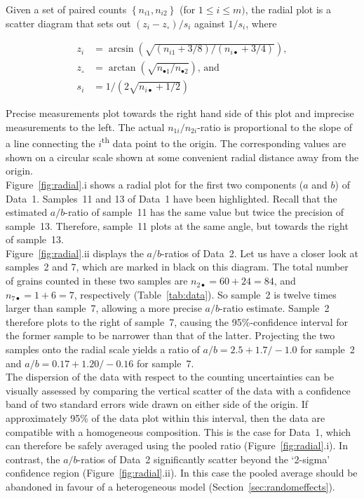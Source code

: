 \documentclass{article}
\begin{document}
Given a set of paired counts $\left\{n_{i1},n_{i2}\right\}$ (for $1
\leq i \leq m)$, the radial plot is a scatter diagram that sets out
$(z_i-z_\circ)/s_i$ against $1/s_i$, where

\begin{equation}
  \begin{split}
    z_i & = \arcsin\left(\sqrt{(n_{i1}+3/8)/(n_{i\bullet}+3/4)}\right) ,\\
    z_\circ & = \arctan\left(\sqrt{n_{\bullet 1}/n_{\bullet 2}}\right)
    \mbox{,~and}\\
    s_i & = 1 / \left(2 \sqrt{n_{i\bullet}+1/2}\right)
  \end{split}
  \label{eq:radial}
\end{equation}

Precise measurements plot towards the right hand side of this plot and
imprecise measurements to the left. The actual $n_{1i}/n_{2i}$-ratio
is proportional to the slope of a line connecting the
$i$\textsuperscript{th} data point to the origin. The corresponding
values are shown on a circular scale shown at some convenient radial
distance away from the origin.\\

Figure~\ref{fig:radial}.i shows a radial plot for the first two
components ($a$ and $b$) of Data~1.  Samples~11 and 13 of Data~1 have
been highlighted. Recall that the estimated $a/b$-ratio of sample~11
has the same value but twice the precision of sample~13. Therefore,
sample~11 plots at the same angle, but towards the right of
sample~13.\\

Figure~\ref{fig:radial}.ii displays the $a/b$-ratios of Data~2. Let us
have a closer look at samples~2 and 7, which are marked in black on
this diagram. The total number of grains counted in these two samples
are $n_{2\bullet} = 60 + 24 = 84$, and $n_{7\bullet} = 1 + 6 = 7$,
respectively (Table~\ref{tab:data}). So sample~2 is twelve times
larger than sample~7, allowing a more precise $a/b$-ratio estimate.
Sample~2 therefore plots to the right of sample~7, causing the
95\%-confidence interval for the former sample to be narrower than
that of the latter.  Projecting the two samples onto the radial scale
yields a ratio of $a/b = 2.5 +1.7/-1.0$ for sample~2 and $a/b = 0.17
+1.20/-0.16$ for sample~7.\\

The dispersion of the data with respect to the counting uncertainties
can be visually assessed by comparing the vertical scatter of the data
with a confidence band of two standard errors wide drawn on either
side of the origin.  If approximately 95\% of the data plot within
this interval, then the data are compatible with a homogeneous
composition. This is the case for Data~1, which can therefore be
safely averaged using the pooled ratio (Figure~\ref{fig:radial}.i).
In contrast, the $a/b$-ratios of Data~2 significantly scatter beyond
the `2-sigma' confidence region (Figure~\ref{fig:radial}.ii). In this
case the pooled average should be abandoned in favour of a
heterogeneous model (Section~\ref{sec:randomeffects}).\\
\end{document}
